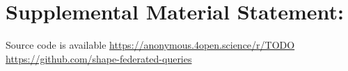 \section*{Supplemental Material Statement:}
Source code is available
\ifanonymous
  \url{https://anonymous.4open.science/r/TODO}
\else
  \url{https://github.com/shape-federated-queries}
\fi
